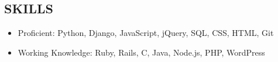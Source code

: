 \documentclass[margin]{res}
\begin{document}
\begin{resume}
\section{SKILLS}
\begin{itemize}[leftmargin=0pt]
\item[] Proficient: Python, Django, JavaScript, jQuery, SQL, CSS, HTML, Git
\item[] Working Knowledge: Ruby, Rails, C, Java, Node.js, PHP, WordPress
\end{itemize}

\end{resume}
\end{document}
